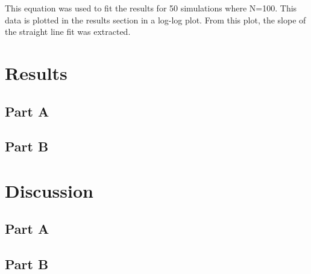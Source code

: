 \documentclass[12pt]{article}
\begin{document}
\indent This equation was used to fit the results for 50 simulations where N=100. This data is plotted in the results section in a log-log plot. From this plot, the slope of the straight line fit was extracted.

\section{Results}

\subsection{Part A}

\subsection{Part B}

\section{Discussion}

\subsection{Part A}

\subsection{Part B}
\end{document}
